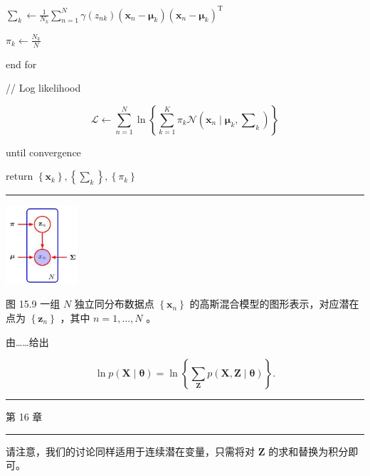 \documentclass[10pt]{report}
\newcommand{\HRule}{\begin{center}\rule{0.9\linewidth}{0.2mm}\end{center}}
\begin{document}
\hspace*{3em} \({\mathbf{\sum }}_{k} \leftarrow  \frac{1}{{N}_{k}}\mathop{\sum }\limits_{{n = 1}}^{N}\gamma \left( {z}_{nk}\right) \left( {{\mathbf{x}}_{n} - {\mathbf{\mu }}_{k}}\right) {\left( {\mathbf{x}}_{n} - {\mathbf{\mu }}_{k}\right) }^{\mathrm{T}}\)

\hspace*{3em} \({\pi }_{k} \leftarrow  \frac{{N}_{k}}{N}\)

\hspace*{1em} end for

\hspace*{1em} // Log likelihood

\[
\mathcal{L} \leftarrow  \mathop{\sum }\limits_{{n = 1}}^{N}\ln \left\{  {\mathop{\sum }\limits_{{k = 1}}^{K}{\pi }_{k}\mathcal{N}\left( {{\mathbf{x}}_{n} \mid  {\mathbf{\mu }}_{k},{\mathbf{\sum }}_{k}}\right) }\right\}
\]

until convergence

return \(\left\{  {\mathbf{x}}_{k}\right\}  ,\left\{  {\mathbf{\sum }}_{k}\right\}  ,\left\{  {\pi }_{k}\right\}\)

\HRule

\begin{center}
\includegraphics[max width=0.2\textwidth]{images/0194e279-9b28-703a-88f4-c3ac21e2010d_495_1216_345_284_311_0.jpg}
\end{center}
\hspace*{3em} 

图 15.9 一组 \(N\) 独立同分布数据点 \(\left\{  {\mathbf{x}}_{n}\right\}\) 的高斯混合模型的图形表示，对应潜在点为 \(\left\{  {\mathbf{z}}_{n}\right\}\) ，其中 \(n = 1,\ldots ,N\) 。

由……给出

\[
\ln p\left( {\mathbf{X} \mid  \mathbf{\theta }}\right)  = \ln \left\{  {\mathop{\sum }\limits_{\mathbf{Z}}p\left( {\mathbf{X},\mathbf{Z} \mid  \mathbf{\theta }}\right) }\right\}  . \tag{15.22}
\]

\HRule

第 16 章

\HRule

请注意，我们的讨论同样适用于连续潜在变量，只需将对 \(\mathbf{Z}\) 的求和替换为积分即可。
\end{document}
